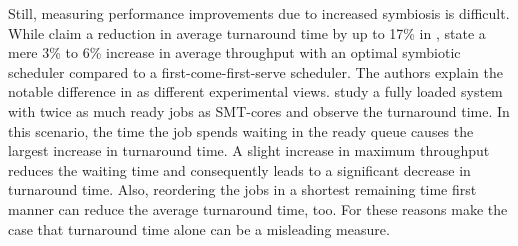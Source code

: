 \begin{comment}
In \citeyear{snavely_symbiotic_2002} \citeauthor{snavely_symbiotic_2002}
discuss the topic of priorities in symbiotic schedules.
In their earlier work (\cite{snavely_symbiotic_2000}) they assume same
priority jobs.
Now, they present two meanings for priority: ``(A) guarantee a fraction of
machine proportional to priority'' or ``(B) guarantee a fraction of
single-threaded performance proportional to priority''
(\autocite[70]{snavely_symbiotic_2002}).
The authors base their priority mechanisms on two values: SOLOFRAC and CS.
SOLOFRAC is the, from the priority derived fraction of the CPU time,
a job needs to be scheduled alone and CS is the fraction of the CPU time,
where no job is solo scheduled.

The 'Naive' priority mechanism schedules a job alone for its SOLOFRAC
share and co-schedules for CS cycles. Behind this stand two assumptions: first,
during co-scheduling each job is an equal share of the cycles assigned.
And second, the number of jobs does not exceed the number of \gls{smt}-cores.

The proposed 'Symb' mechanism on the other hand, can handle more jobs
than available \gls{smt}-cores and observes job behaviour. By running jobs
solo, 'Symb' determines the job's ``'natural' IPC''
(\autocite[71]{snavely_symbiotic_2002})
and then evaluates the job's performance during a phase of co-scheduling.
Based on this measurement, the SOLOFRAC portion is reduced such that the job get its
rightful share of cycles. The increase in co-scheduling time leads to increased
utilization of the system.

Other presented approaches in \cite{snavely_symbiotic_2002} require hardware
changes and are therefore out of scope.
\\
\end{comment}

Still, measuring performance improvements due to increased symbiosis is
difficult.
While \citeauthor{snavely_symbiotic_2000} claim a reduction in average
turnaround time by up to 17\% in \cite{snavely_symbiotic_2000},
\citeauthor{eyerman_revisiting_2015} state a mere 3\% to 6\% increase in
average throughput with an optimal symbiotic scheduler compared to a
first-come-first-serve scheduler.
The authors explain the notable difference in \cite{eyerman_revisiting_2015} as
different experimental views.
\citeauthor{snavely_symbiotic_2000} study a fully loaded system with twice
as much ready jobs as SMT-cores and observe the turnaround time.
In this scenario, the time the job spends waiting in the ready queue causes the
largest increase in turnaround time.
A slight increase in maximum throughput reduces the waiting time and
consequently leads to a significant decrease in turnaround time.
Also, reordering the jobs in a shortest remaining time first manner can
reduce the average turnaround time, too.
For these reasons \citeauthor{eyerman_revisiting_2015} make the case
that turnaround time alone can be a misleading measure.

